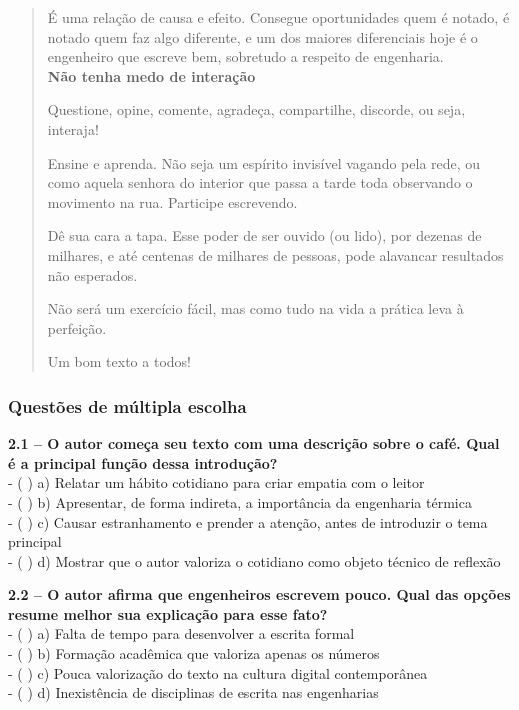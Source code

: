 \documentclass[
  12pt,
]{article}
\begin{document}
\begin{quote}
É uma relação de causa e efeito. Consegue oportunidades quem é notado, é notado quem faz algo diferente, e um dos maiores diferenciais hoje é o engenheiro que escreve bem, sobretudo a respeito de engenharia.\\

\textbf{Não tenha medo de interação}

Questione, opine, comente, agradeça, compartilhe, discorde, ou seja, interaja!

Ensine e aprenda. Não seja um espírito invisível vagando pela rede, ou como aquela senhora do interior que passa a tarde toda observando o movimento na rua. Participe escrevendo.

Dê sua cara a tapa. Esse poder de ser ouvido (ou lido), por dezenas de milhares, e até centenas de milhares de pessoas, pode alavancar resultados não esperados.

Não será um exercício fácil, mas como tudo na vida a prática leva à perfeição.

Um bom texto a todos!

\end{quote}

\subsubsection{Questões de múltipla
escolha}\label{questuxf5es-de-muxfaltipla-escolha}

\textbf{2.1 -- O autor começa seu texto com uma descrição sobre o café.
Qual é a principal função dessa introdução?}\\
- ( ) a) Relatar um hábito cotidiano para criar empatia com o leitor\\
- ( ) b) Apresentar, de forma indireta, a importância da engenharia
térmica\\
- ( ) c) Causar estranhamento e prender a atenção, antes de introduzir o
tema principal\\
- ( ) d) Mostrar que o autor valoriza o cotidiano como objeto técnico de
reflexão

\vspace{0.5cm}

\textbf{2.2 -- O autor afirma que engenheiros escrevem pouco. Qual das
opções resume melhor sua explicação para esse fato?}\\
- ( ) a) Falta de tempo para desenvolver a escrita formal\\
- ( ) b) Formação acadêmica que valoriza apenas os números\\
- ( ) c) Pouca valorização do texto na cultura digital contemporânea\\
- ( ) d) Inexistência de disciplinas de escrita nas engenharias
\end{document}
